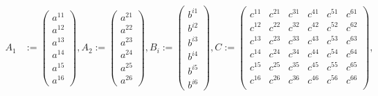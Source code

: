 $$
\begin{aligned}
A_1&:=\begin{pmatrix} a^{11}\\a^{12}\\a^{13}\\a^{14}\\a^{15}\\a^{16} \end{pmatrix}\!\!, 
A_2:=\begin{pmatrix} a^{21}\\a^{22}\\a^{23}\\a^{24}\\a^{25}\\a^{26} \end{pmatrix}\!\!, 
B_i:=\begin{pmatrix} b^{i1}\\b^{i2}\\b^{i3}\\b^{i4}\\b^{i5}\\b^{i6} \end{pmatrix}\!\!, 
C:=\begin{pmatrix} 
	c^{11} & c^{21} & c^{31} & c^{41} & c^{51} & c^{61} \\ 
	c^{12} & c^{22} & c^{32} & c^{42} & c^{52} & c^{62} \\ 
	c^{13} & c^{23} & c^{33} & c^{43} & c^{53} & c^{63} \\ 
	c^{14} & c^{24} & c^{34} & c^{44} & c^{54} & c^{64} \\ 
	c^{15} & c^{25} & c^{35} & c^{45} & c^{55} & c^{65} \\ 
	c^{16} & c^{26} & c^{36} & c^{46} & c^{56} & c^{66} \\ 
	\end{pmatrix}\!\!,
\end{aligned}
$$	
